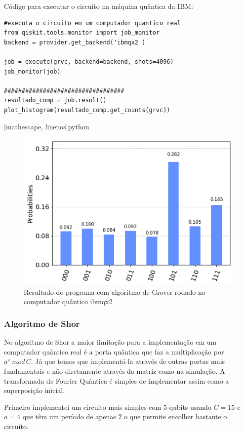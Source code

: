 \documentclass[12pt,a4paper]{article}
\begin{document}
Código para executar o circuito na máquina quântica da IBM:
\begin{verbatim}
#executa o circuito em um computador quantico real
from qiskit.tools.monitor import job_monitor
backend = provider.get_backend('ibmqx2')

job = execute(grvc, backend=backend, shots=4096)
job_monitor(job)

##################################
resultado_comp = job.result()
plot_histogram(resultado_comp.get_counts(grvc))

\end{verbatim}[mathescape, linenos]{python}


\begin{figure}[h!]
    \centering
    \includegraphics[width=1\textwidth]{groovercq.png}
        \caption{Resultado do programa com algoritmo de Grover rodado no computador quântico ibmqx2}
    \label{fig:groovercq}
\end{figure}

\subsubsection{Algoritmo de Shor}
No algoritmo de Shor a maior limitação para a implementação em um computador quântico real é a porta quântica que faz a multiplicação por $a^x\,mod\,C$. Já que temos que implementá-la através de outras portas mais fundamentais e não diretamente através da matriz como na simulação. A transformada de Fourier Quântica é simples de implementar assim como a superposição inicial. 

Primeiro implementei um circuito mais simples com 5 qubits usando $C=15$ e $a=4$ que têm um período de apenas 2 o que permite encolher bastante o circuito.
\end{document}

